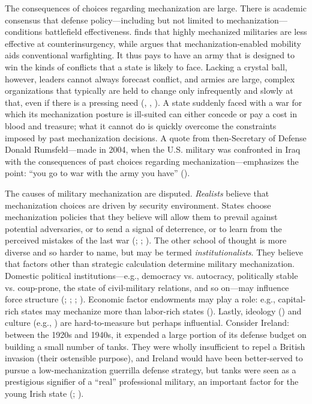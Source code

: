 \documentclass{article}
\begin{document}
The consequences of choices regarding mechanization are large. There is
academic consensus that defense policy---including but not limited to
mechanization---conditions battlefield effectiveness. 
\cite{lyall2009rage} finds that highly mechanized militaries are less effective
at counterinsurgency, while \cite{biddle2004military} argues that
mechanization-enabled mobility aids conventional warfighting. It thus
pays to have an army that is designed to win the
kinds of
conflicts that a state is likely to face. Lacking a crystal ball, however,
leaders cannot always forecast conflict, and armies are large, complex
organizations that typically are held to change only infrequently and slowly at
that, even if there is a pressing need (\cite{murray1998military},
\cite{locher2004victory}, \cite{zegart2000flawed}). A state suddenly faced with
a war for which its mechanization posture is ill-suited can either concede or
pay a cost in blood and treasure; what it cannot do is
quickly overcome the constraints imposed by past mechanization decisions. 
A quote from then-Secretary of Defense Donald Rumsfeld---made in 2004, when the U.S. military
was confronted in Iraq with the consequences of past choices regarding
mechanization---emphasizes the point:
``you go to war with the army you have'' (\cite{schmitt_2004}). 

The causes of military mechanization are disputed. \textit{Realists} believe 
that mechanization choices are driven by security environment. States
choose mechanization policies that they believe will allow them to prevail against potential adversaries, or to send a
signal of deterrence, or to learn from the perceived mistakes of the last war
(\cite{mearsheimer1983conventional};
\cite{huth1988extended}; \cite{murray2011military}). The other school of thought is more
diverse and so harder to name, but may be termed 
\textit{institutionalists}. They believe that factors other than 
strategic calculation determine military mechanization. Domestic political
institutions---e.g., democracy vs. autocracy, politically stable vs.
coup-prone, the state of civil-military relations, and so on---may influence 
force structure (\cite{reiter2002democracies}; \cite{quinlivan1999coup};
\cite{talmadge2015dictator}; \cite{brooks2008shaping}). Economic factor
endowments may play a role: e.g., capital-rich states may mechanize more
than labor-rich states (\cite{gartzke2001democracy}). Lastly,
ideology (\cite{van1984cult}) and culture (e.g., \cite{pollack2004arabs}) are
hard-to-measure but perhaps influential. Consider Ireland: between the 1920s and
1940s, it expended a large portion of its defense budget on building
a small number of tanks. They were wholly insufficient to repel a British 
invasion (their ostensible purpose), and
Ireland would have been better-served to pursue a low-mechanization guerrilla
defense strategy, but tanks were seen as a prestigious signifier of a ``real''
professional military, an important factor for the young Irish state
(\cite{farrell1998professionalization};
\cite{farrell2001transnational}).
\end{document}
